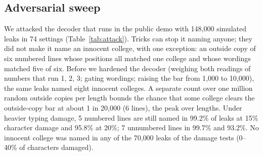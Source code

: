 \documentclass[10pt,a4paper]{article}
\theoremstyle{remark}
\begin{document}
\subsection{Adversarial sweep}
We attacked the decoder that runs in the public demo with 148{,}000 simulated leaks in 74 settings (Table~\ref{tab:attack}). Tricks can stop it naming anyone; they did not make it name an innocent college, with one exception: an outside copy of six numbered lines whose positions all matched one college and whose wordings matched five of six. Before we hardened the decoder (weighing both readings of numbers that run 1, 2, 3; gating wordings; raising the bar from 1{,}000 to 10{,}000), the same leaks named eight innocent colleges. A separate count over one million random outside copies per length bounds the chance that some college clears the outside-copy bar at about 1 in 20{,}000 (6 lines), the peak over lengths. Under heavier typing damage, 5 numbered lines are still named in 99.2\% of leaks at 15\% character damage and 95.8\% at 20\%; 7 unnumbered lines in 99.7\% and 93.2\%. No innocent college was named in any of the 70{,}000 leaks of the damage tests (0--40\% of characters damaged).
\end{document}
